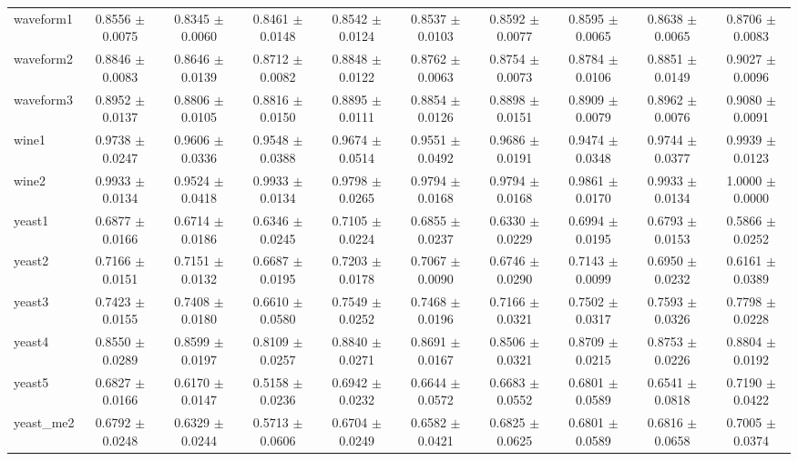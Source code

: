 \begin{table*}[htbp]
\begin{tabular}{lccccccccc}
            waveform1 & 0.8556 $\pm$ 0.0075 & 0.8345 $\pm$ 0.0060 & 0.8461 $\pm$ 0.0148 & 0.8542 $\pm$ 0.0124 & 0.8537 $\pm$ 0.0103 & 0.8592 $\pm$ 0.0077 & 0.8595 $\pm$ 0.0065 & 0.8638 $\pm$ 0.0065 & 0.8706 $\pm$ 0.0083 \\ 
            waveform2 & 0.8846 $\pm$ 0.0083 & 0.8646 $\pm$ 0.0139 & 0.8712 $\pm$ 0.0082 & 0.8848 $\pm$ 0.0122 & 0.8762 $\pm$ 0.0063 & 0.8754 $\pm$ 0.0073 & 0.8784 $\pm$ 0.0106 & 0.8851 $\pm$ 0.0149 & 0.9027 $\pm$ 0.0096 \\ 
            waveform3 & 0.8952 $\pm$ 0.0137 & 0.8806 $\pm$ 0.0105 & 0.8816 $\pm$ 0.0150 & 0.8895 $\pm$ 0.0111 & 0.8854 $\pm$ 0.0126 & 0.8898 $\pm$ 0.0151 & 0.8909 $\pm$ 0.0079 & 0.8962 $\pm$ 0.0076 & 0.9080 $\pm$ 0.0091 \\ 
            wine1 & 0.9738 $\pm$ 0.0247 & 0.9606 $\pm$ 0.0336 & 0.9548 $\pm$ 0.0388 & 0.9674 $\pm$ 0.0514 & 0.9551 $\pm$ 0.0492 & 0.9686 $\pm$ 0.0191 & 0.9474 $\pm$ 0.0348 & 0.9744 $\pm$ 0.0377 & 0.9939 $\pm$ 0.0123 \\ 
            wine2 & 0.9933 $\pm$ 0.0134 & 0.9524 $\pm$ 0.0418 & 0.9933 $\pm$ 0.0134 & 0.9798 $\pm$ 0.0265 & 0.9794 $\pm$ 0.0168 & 0.9794 $\pm$ 0.0168 & 0.9861 $\pm$ 0.0170 & 0.9933 $\pm$ 0.0134 & 1.0000 $\pm$ 0.0000 \\ 
            yeast1 & 0.6877 $\pm$ 0.0166 & 0.6714 $\pm$ 0.0186 & 0.6346 $\pm$ 0.0245 & 0.7105 $\pm$ 0.0224 & 0.6855 $\pm$ 0.0237 & 0.6330 $\pm$ 0.0229 & 0.6994 $\pm$ 0.0195 & 0.6793 $\pm$ 0.0153 & 0.5866 $\pm$ 0.0252 \\
            yeast2 & 0.7166 $\pm$ 0.0151 & 0.7151 $\pm$ 0.0132 & 0.6687 $\pm$ 0.0195 & 0.7203 $\pm$ 0.0178 & 0.7067 $\pm$ 0.0090 & 0.6746 $\pm$ 0.0290 & 0.7143 $\pm$ 0.0099 & 0.6950 $\pm$ 0.0232 & 0.6161 $\pm$ 0.0389 \\ 
            yeast3 & 0.7423 $\pm$ 0.0155 & 0.7408 $\pm$ 0.0180 & 0.6610 $\pm$ 0.0580 & 0.7549 $\pm$ 0.0252 & 0.7468 $\pm$ 0.0196 & 0.7166 $\pm$ 0.0321 & 0.7502 $\pm$ 0.0317 & 0.7593 $\pm$ 0.0326 & 0.7798 $\pm$ 0.0228 \\ 
            yeast4 & 0.8550 $\pm$ 0.0289 & 0.8599 $\pm$ 0.0197 & 0.8109 $\pm$ 0.0257 & 0.8840 $\pm$ 0.0271 & 0.8691 $\pm$ 0.0167 & 0.8506 $\pm$ 0.0321 & 0.8709 $\pm$ 0.0215 & 0.8753 $\pm$ 0.0226 & 0.8804 $\pm$ 0.0192 \\ 
            yeast5 & 0.6827 $\pm$ 0.0166 & 0.6170 $\pm$ 0.0147 & 0.5158 $\pm$ 0.0236 & 0.6942 $\pm$ 0.0232 & 0.6644 $\pm$ 0.0572 & 0.6683 $\pm$ 0.0552 & 0.6801 $\pm$ 0.0589 & 0.6541 $\pm$ 0.0818 & 0.7190 $\pm$ 0.0422 \\ 
            yeast\_me2 & 0.6792 $\pm$ 0.0248 & 0.6329 $\pm$ 0.0244 & 0.5713 $\pm$ 0.0606 & 0.6704 $\pm$ 0.0249 & 0.6582 $\pm$ 0.0421 & 0.6825 $\pm$ 0.0625 & 0.6801 $\pm$ 0.0589 & 0.6816 $\pm$ 0.0658 & 0.7005 $\pm$ 0.0374 \\ 
        \bottomrule
    \end{tabular}
\end{table*}
